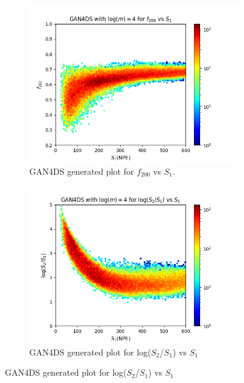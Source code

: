 \documentclass[11pt]{article} %
\begin{document}
\begin{figure}[H]
\begin{minipage}{\textwidth}
\end{minipage}
\begin{minipage}{\textwidth}
  \begin{subfigure}{.5\textwidth}
      \centering\captionsetup{width=.9\linewidth}%
      \includegraphics[scale=0.6]{./images/4/gan_f200_vs_s1.png}
      \caption{GAN4DS generated plot for $f_{200}$ vs $S_1$.}
  \end{subfigure}
  \begin{subfigure}{.5\textwidth}
      \centering\captionsetup{width=.9\linewidth}%
      \includegraphics[scale=0.6]{./images/4/gan_s1_over_s2_vs_s1.png}
      \caption{GAN4DS generated plot for log($S_2$/$S_1$) vs $S_1$}
  \end{subfigure}

\end{minipage}
\end{figure}
\end{document}
